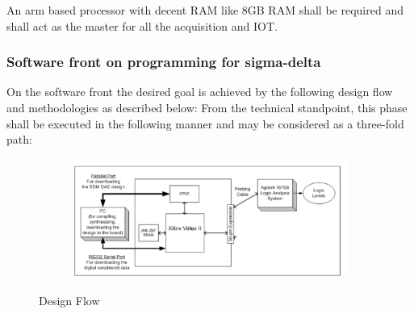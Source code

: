 \documentclass{FR16}
\begin{document}
An arm based processor with decent RAM like 8GB RAM shall be required and shall act as the master  for all the acquisition and IOT. 


\subsubsection{Software front on programming for sigma-delta}
On the software front the desired goal is achieved by the following design flow and methodologies as described below:
From the technical standpoint, this phase shall be executed in the following manner and may be considered as a three-fold path:

  \begin{figure}[H]
 
    \begin{subfigure}{\textwidth}
    \includegraphics[scale=0.5]{Pictorial_dipiction.png} 
    \label{fig:DJp1}
    \end{subfigure}
 
 \caption{Design Flow}
\label{fig6}
\end{figure}
    
\end{document}

